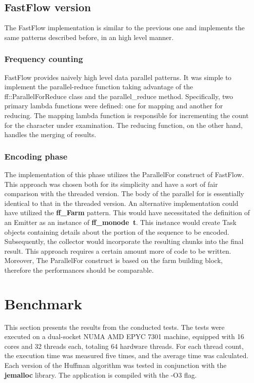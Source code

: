 \documentclass{article}
\begin{document}
\subsection{FastFlow version}
The FastFlow implementation is similar to the previous one and
implements the same patterns described before, in an high level manner.
\subsubsection{Frequency counting}
FastFlow provides naively high level data parallel patterns. It was simple
to implement the parallel-reduce function taking advantage of the ff::ParallelForReduce
class and the parallel\_reduce method.
Specifically, two primary lambda functions were defined: one for mapping and another for reducing.
The mapping lambda function is responsible for incrementing the count for the character under examination.
The reducing function, on the other hand, handles the merging of results.
\subsubsection{Encoding phase}
The implementation of this phase utilizes the ParallelFor construct of FastFlow.
This approach was chosen both for its simplicity and have a sort of fair comparison
with the threaded version. The body of the parallel for is essentially identical
to that in the threaded version.
An alternative implementation could have utilized the \textbf{ff\_Farm} pattern.
This would have necessitated the definition of an Emitter as an instance of \textbf{ff\_monode\ t}.
This instance would create Task objects containing details about the portion of the sequence to be
encoded. Subsequently, the collector would incorporate the resulting chunks into the final result.
This approach requires a certain amount more of code to be written. Moreover, The ParallelFor
construct is based on the farm building block, therefore the performances should be comparable.

\section{Benchmark}
This section presents the results from the conducted tests. The tests were executed on a dual-socket NUMA
AMD EPYC 7301 machine, equipped with 16 cores and 32 threads each, totaling 64 hardware threads.
For each thread count, the execution time was measured five times, and the average time was calculated.
Each version of the Huffman algorithm was tested in conjunction with the \textbf{jemalloc} library.
The application is compiled with the -O3 flag.
\end{document}
